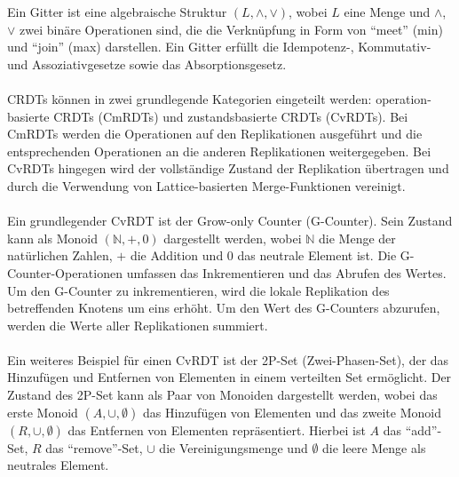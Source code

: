 Ein Gitter ist eine algebraische Struktur $(L, \wedge, \vee)$, wobei $L$ eine Menge und $\wedge$, $\vee$ zwei binäre Operationen sind, die die Verknüpfung in Form von \enquote{meet} (min) und \enquote{join} (max) darstellen. Ein Gitter erfüllt die Idempotenz-, Kommutativ- und Assoziativgesetze sowie das Absorptionsgesetz.
\\\\
CRDTs können in zwei grundlegende Kategorien eingeteilt werden: operation-basierte CRDTs (CmRDTs) und zustandsbasierte CRDTs (CvRDTs). Bei CmRDTs werden die Operationen auf den Replikationen ausgeführt und die entsprechenden Operationen an die anderen Replikationen weitergegeben. Bei CvRDTs hingegen wird der vollständige Zustand der Replikation übertragen und durch die Verwendung von Lattice-basierten Merge-Funktionen vereinigt.
\\\\
Ein grundlegender CvRDT ist der Grow-only Counter (G-Counter). Sein Zustand kann als Monoid $(\mathbb{N}, +, 0)$ dargestellt werden, wobei $\mathbb{N}$ die Menge der natürlichen Zahlen, $+$ die Addition und $0$ das neutrale Element ist. Die G-Counter-Operationen umfassen das Inkrementieren und das Abrufen
des Wertes. Um den G-Counter zu inkrementieren, wird die lokale Replikation des betreffenden Knotens um eins erhöht. Um den Wert des G-Counters abzurufen, werden die Werte aller Replikationen summiert.
\\\\
Ein weiteres Beispiel für einen CvRDT ist der 2P-Set (Zwei-Phasen-Set), der das Hinzufügen und Entfernen von Elementen in einem verteilten Set ermöglicht. Der Zustand des 2P-Set kann als Paar von Monoiden dargestellt werden, wobei das erste Monoid $(A, \cup, \emptyset)$ das Hinzufügen von Elementen und das zweite Monoid $(R, \cup, \emptyset)$ das Entfernen von Elementen repräsentiert. Hierbei ist $A$ das \enquote{add}-Set, $R$ das \enquote{remove}-Set, $\cup$ die Vereinigungsmenge und $\emptyset$ die leere Menge als neutrales Element.

